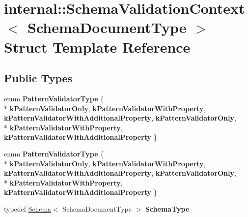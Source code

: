 \hypertarget{structinternal_1_1_schema_validation_context}{}\section{internal\+:\+:Schema\+Validation\+Context$<$ Schema\+Document\+Type $>$ Struct Template Reference}
\label{structinternal_1_1_schema_validation_context}
\subsection*{Public Types}
\begin{DoxyCompactItemize}
\item 
enum {\bfseries Pattern\+Validator\+Type} \{ \\*
{\bfseries k\+Pattern\+Validator\+Only}, 
{\bfseries k\+Pattern\+Validator\+With\+Property}, 
{\bfseries k\+Pattern\+Validator\+With\+Additional\+Property}, 
{\bfseries k\+Pattern\+Validator\+Only}, 
\\*
{\bfseries k\+Pattern\+Validator\+With\+Property}, 
{\bfseries k\+Pattern\+Validator\+With\+Additional\+Property}
 \}\hypertarget{structinternal_1_1_schema_validation_context_a4fb1b8fe7ecb9d4608e6b0ac0716826c}{}\label{structinternal_1_1_schema_validation_context_a4fb1b8fe7ecb9d4608e6b0ac0716826c}

\item 
enum {\bfseries Pattern\+Validator\+Type} \{ \\*
{\bfseries k\+Pattern\+Validator\+Only}, 
{\bfseries k\+Pattern\+Validator\+With\+Property}, 
{\bfseries k\+Pattern\+Validator\+With\+Additional\+Property}, 
{\bfseries k\+Pattern\+Validator\+Only}, 
\\*
{\bfseries k\+Pattern\+Validator\+With\+Property}, 
{\bfseries k\+Pattern\+Validator\+With\+Additional\+Property}
 \}\hypertarget{structinternal_1_1_schema_validation_context_a4fb1b8fe7ecb9d4608e6b0ac0716826c}{}\label{structinternal_1_1_schema_validation_context_a4fb1b8fe7ecb9d4608e6b0ac0716826c}

\item 
typedef \hyperlink{classinternal_1_1_schema}{Schema}$<$ Schema\+Document\+Type $>$ {\bfseries Schema\+Type}\hypertarget{structinternal_1_1_schema_validation_context_a79b155ab3711b97b6e33ced450614397}{}\label{structinternal_1_1_schema_validation_context_a79b155ab3711b97b6e33ced450614397}


\end{DoxyCompactItemize}
